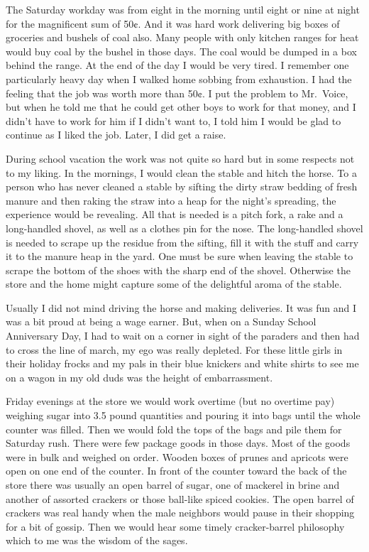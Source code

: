 \documentclass[12pt]{book}              %
\begin{document}
The Saturday workday was from eight in the morning until eight or nine at night for the magnificent sum of 50$\cent$. And it was hard work delivering big boxes of groceries and bushels of coal also. Many people with only kitchen ranges for heat would buy coal by the bushel in those days. The coal would be dumped in a box behind the range. At the end of the day I would be very tired. I remember one particularly heavy day when I walked home sobbing from exhaustion. I had the feeling that the job was worth more than 50$\cent$. I put the problem to Mr.~Voice, but when he told me that he could get other boys to work for that money, and I didn't have to work for him if I didn't want to, I told him I would be glad to continue as I liked the job. Later, I did get a raise. 

During school vacation the work was not quite so hard but in some respects not to my liking. In the mornings, I would clean the stable and hitch the horse. To a person who has never cleaned a stable by sifting the dirty straw bedding of fresh manure and then raking the straw into a heap for the night's spreading, the experience would be revealing. All that is needed is a pitch fork, a rake and a long-handled shovel, as well as a clothes pin for the nose. The long-handled shovel is needed to scrape up the residue from the sifting, fill it with the stuff and carry it to the manure heap in the yard. One must be sure when leaving the stable to scrape the bottom of the shoes with the sharp end of the shovel. Otherwise the store and the home might capture some of the delightful aroma of the stable. 

Usually I did not mind driving the horse and making deliveries. It was fun and I was a bit proud at being a wage earner. But, when on a Sunday School Anniversary Day, I had to wait on a corner in sight of the paraders and then had to cross the line of march, my ego was really depleted. For these little girls in their holiday frocks and my pals in their blue knickers and white shirts to see me on a wagon in my old duds was the height of embarrassment. 

Friday evenings at the store we would work overtime (but no overtime pay) weighing sugar into 3.5 pound quantities and pouring it into bags until the whole counter was filled. Then we would fold the tops of the bags and pile them for Saturday rush. There were few package goods in those days. Most of the goods were in bulk and weighed on order. Wooden boxes of prunes and apricots were open on one end of the counter. In front of the counter toward the back of the store there was usually an open barrel of sugar, one of mackerel in brine and another of assorted crackers or those ball-like spiced cookies. The open barrel of crackers was real handy when the male neighbors would pause in their shopping for a bit of gossip. Then we would hear some timely cracker-barrel philosophy which to me was the wisdom of the sages. 
\end{document}
